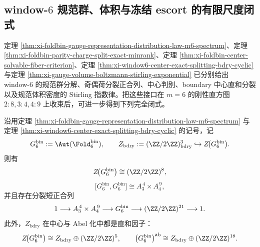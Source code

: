 \subsection{window-\texorpdfstring{$6$}{6} 规范群、体积与冻结 escort 的有限尺度闭式}

定理 \ref{thm:xi-foldbin-gauge-representation-distribution-law-m6-spectrum}、定理 \ref{thm:xi-foldbin-parity-charge-split-exact-minrank}、定理 \ref{thm:xi-foldbin-center-solvable-fiber-criterion}、定理 \ref{thm:xi-window6-center-exact-splitting-bdry-cyclic} 与定理 \ref{thm:xi-gauge-volume-boltzmann-stirling-exponential} 已分别给出 window-\(6\) 的规范群分解、奇偶荷分裂正合列、中心判别、boundary 中心直和分裂以及规范体积密度的 Stirling 指数律。把这些接口在 \(m=6\) 的刚性直方图 \(2:8,3:4,4:9\) 上收束后，可进一步得到下列完全闭式。

\begin{theorem}\label{thm:derived-window6-gauge-center-derived-splitting}
沿用定理 \ref{thm:xi-foldbin-gauge-representation-distribution-law-m6-spectrum} 与定理 \ref{thm:xi-window6-center-exact-splitting-bdry-cyclic} 的记号，记
\[
G_6^{\mathrm{bin}}:=\Aut(\Fold_6^{\mathrm{bin}}),
\qquad
Z_{\mathrm{bdry}}:=(\ZZ/2\ZZ)^3_{\mathrm{bdry}}\hookrightarrow Z\!\bigl(G_6^{\mathrm{bin}}\bigr).
\]
则有
\[
Z\!\bigl(G_6^{\mathrm{bin}}\bigr)\cong (\ZZ/2\ZZ)^8,
\]
\[
\bigl[G_6^{\mathrm{bin}},G_6^{\mathrm{bin}}\bigr]\cong A_3^{\,4}\times A_4^{\,9},
\]
并且存在分裂短正合列
\[
1\longrightarrow A_3^{\,4}\times A_4^{\,9}
\longrightarrow G_6^{\mathrm{bin}}
\longrightarrow (\ZZ/2\ZZ)^{21}
\longrightarrow 1.
\]
此外，\(Z_{\mathrm{bdry}}\) 在中心与 Abel 化中都是直和因子：
\[
Z\!\bigl(G_6^{\mathrm{bin}}\bigr)\cong Z_{\mathrm{bdry}}\oplus (\ZZ/2\ZZ)^5,
\qquad
\bigl(G_6^{\mathrm{bin}}\bigr)^{\mathrm{ab}}\cong Z_{\mathrm{bdry}}\oplus (\ZZ/2\ZZ)^{18}.
\]
\end{theorem}
